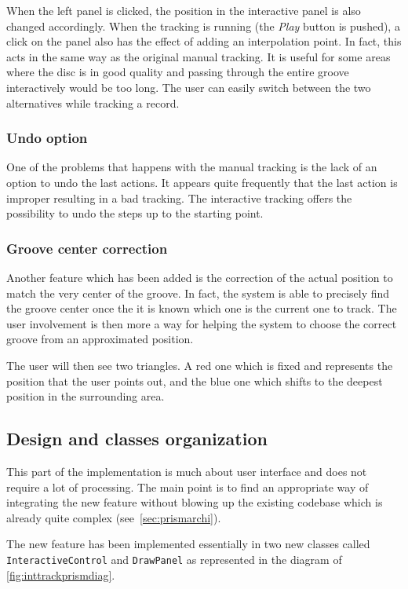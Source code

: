 When the left panel is clicked, the position in the interactive panel is also changed accordingly. When the tracking is running (the \emph{Play} button is pushed), a click on the panel also has the effect of adding an interpolation point. In fact, this acts in the same way as the original manual tracking. It is useful for some areas where the disc is in good quality and passing through the entire groove interactively would be too long. The user can easily switch between the two alternatives while tracking a record.

\subsubsection{Undo option}

One of the problems that happens with the manual tracking is the lack of an option to undo the last actions. It appears quite frequently that the last action is improper resulting in a bad tracking. The interactive tracking offers the possibility to undo the steps up to the starting point.

\subsubsection{Groove center correction}

Another feature which has been added is the correction of the actual position to match the very center of the groove. In fact, the system is able to precisely find the groove center once the it is known which one is the current one to track. The user involvement is then more a way for helping the system to choose the correct groove from an approximated position.

The user will then see two triangles. A red one which is fixed and represents the position that the user points out, and the blue one which shifts to the deepest position in the surrounding area.

\subsection{Design and classes organization}

This part of the implementation is much about user interface and does not require a lot of processing. The main point is to find an appropriate way of integrating the new feature without blowing up the existing codebase which is already quite complex (see~\autoref{sec:prismarchi}).

The new feature has been implemented essentially in two new classes called \texttt{InteractiveControl} and \texttt{DrawPanel} as represented in the diagram of \autoref{fig:inttrackprismdiag}.

